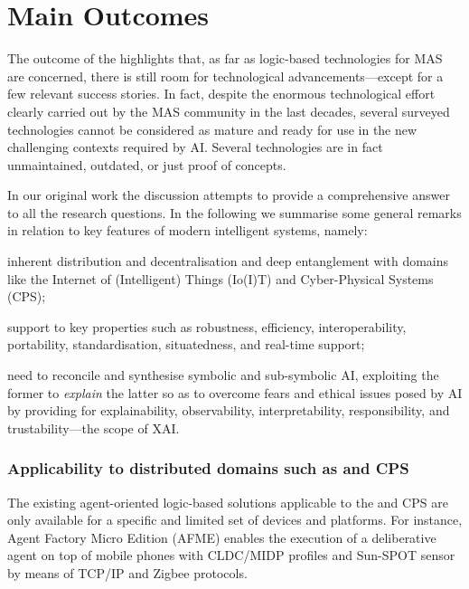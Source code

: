 \documentclass[12pt,a4paper,openright,twoside]{book}
\begin{document}

\section{Main Outcomes}\label{sec:outcomes}

The outcome of the \slr{} highlights that, as far as logic-based technologies for MAS are concerned, there is still room for technological advancements---except for a few relevant success stories.
%
In fact, despite the enormous technological effort clearly carried out by the MAS community in the last decades, several surveyed technologies cannot be considered as mature and ready for use in the new challenging contexts required by AI.
%
Several technologies are in fact unmaintained, outdated, or just proof of concepts.

In our original work the discussion attempts to provide a comprehensive answer to all the \slr{} research questions.
%
In the following we summarise some general remarks in relation to key features of modern intelligent systems, namely:
%
\begin{inlinelist}
    \item inherent distribution and decentralisation and deep entanglement with domains like the Internet of (Intelligent) Things (Io(I)T) and Cyber-Physical Systems (CPS);
    \item support to key properties such as robustness, efficiency, interoperability, portability, standardisation, situatedness, and real-time support;
    \item need to reconcile and synthesise symbolic and sub-symbolic AI, exploiting the former to \emph{explain} the latter so as to overcome fears and ethical issues posed by AI by providing for explainability, observability, interpretability, responsibility, and trustability---the scope of XAI.
\end{inlinelist}

\subsubsection{Applicability to distributed domains such as \iot{} and CPS}

The existing agent-oriented logic-based solutions applicable to the \iot{} and CPS are only available for a specific and limited set of devices and platforms.
%
For instance, Agent Factory Micro Edition (AFME) \cite{afme-iccs2006} enables the execution of a deliberative agent on top of mobile phones with CLDC/MIDP profiles and Sun-SPOT sensor by means of TCP/IP and Zigbee protocols.
\end{document}
